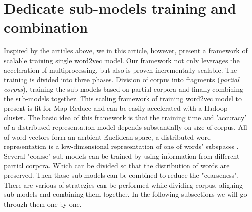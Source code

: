 \section{Dedicate sub-models training and combination}
Inspired by the articles above, we in this article, however, present a framework of scalable training single word2vec model. Our framework not only leverages the acceleration of multiprocessing, but also is proven incrementally scalable. The training is divided into three phases. Division of corpus into fragments (\emph{partial corpus}), training the sub-models based on partial corpora and finally combining the sub-models together. This scaling framework of training word2vec model to present is fit for Map-Reduce \cite{dean2008mapreduce} and can be easily accelerated with a Hadoop cluster. The basic idea of this framework is that the training time and 'accuracy' of a distributed representation model depends substantially on size of corpus. All of word vectors form an ambient Euclidean space, a distributed word representation is a low-dimensional representation of one of words' subspaces \cite{Mahadevan2015reasoning}. Several "coarse" sub-models can be trained by using information from different partial corpora. Which can be divided so that the distribution of words are preserved. Then these sub-models can be combined to reduce the "coarseness". There are various of strategies can be performed while dividing corpus, aligning sub-models and combining them together. In the following subsections we will go through them one by one.






